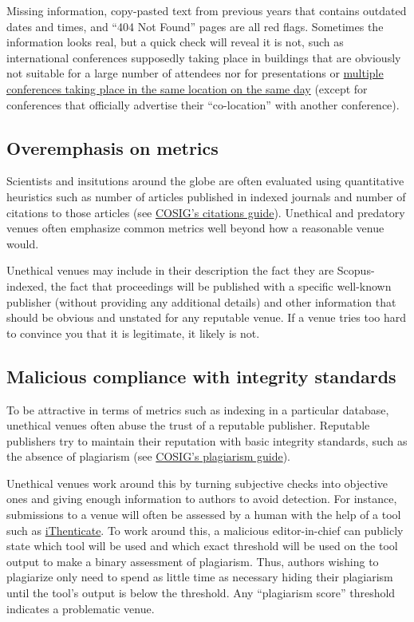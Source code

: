 \documentclass[letterpaper, 12pt]{article}
\begin{document}
Missing information, copy-pasted text from previous years that contains outdated dates and times,
and ``404 Not Found'' pages are all red flags.
Sometimes the information looks real, but a quick check will reveal it is not,
such as international conferences supposedly taking place in buildings that are
obviously not suitable for a large number of attendees nor for presentations or \href{https://doi.org/10.1038/d41586-024-02358-w}{multiple conferences taking place in the same location on the same day} (except for conferences that officially advertise their ``co-location'' with another conference).

\subsection*{Overemphasis on metrics}

Scientists and insitutions around the globe are often evaluated using quantitative heuristics such as number of articles published in indexed journals and number of citations to those articles (see \href{https://osf.io/zpf4r}{COSIG's citations guide}). Unethical and predatory venues often emphasize common metrics well beyond how a reasonable venue would.

Unethical venues may include in their description the fact they are Scopus-indexed,
the fact that proceedings will be published with a specific well-known publisher (without providing any additional details)
and other information that should be obvious and unstated for any reputable venue.
If a venue tries too hard to convince you that it is legitimate, it likely is not.

\subsection*{Malicious compliance with integrity standards}

To be attractive in terms of metrics such as indexing in a particular database,
unethical venues often abuse the trust of a reputable publisher.
Reputable publishers try to maintain their reputation with basic integrity standards, such as the absence of plagiarism (see \href{https://osf.io/ntcb4}{COSIG's plagiarism guide}).

Unethical venues work around this by turning subjective checks into objective ones
and giving enough information to authors to avoid detection.
For instance, submissions to a venue will often be assessed by a human with the help of a tool such as
\href{https://www.ithenticate.com/}{iThenticate}.
To work around this, a malicious editor-in-chief can publicly state which tool will be used
and which exact threshold will be used on the tool output to make a binary assessment of plagiarism.
Thus, authors wishing to plagiarize only need to spend as little time as necessary hiding their plagiarism
until the tool's output is below the threshold.
Any ``plagiarism score'' threshold indicates a problematic venue.
\end{document}
